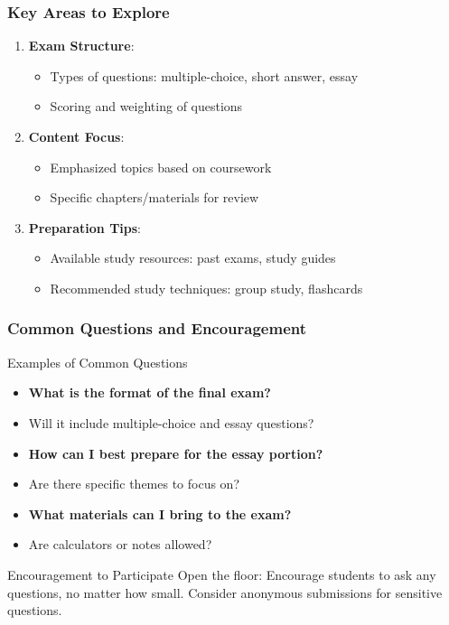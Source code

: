 \documentclass[aspectratio=169]{beamer}
\begin{document}
\begin{frame}[fragile]
    \frametitle{Key Areas to Explore}
    \begin{enumerate}
        \item \textbf{Exam Structure}:
            \begin{itemize}
                \item Types of questions: multiple-choice, short answer, essay
                \item Scoring and weighting of questions
            \end{itemize}
        
        \item \textbf{Content Focus}:
            \begin{itemize}
                \item Emphasized topics based on coursework
                \item Specific chapters/materials for review
            \end{itemize}
        
        \item \textbf{Preparation Tips}:
            \begin{itemize}
                \item Available study resources: past exams, study guides
                \item Recommended study techniques: group study, flashcards
            \end{itemize}
    \end{enumerate}
\end{frame}

\begin{frame}[fragile]
    \frametitle{Common Questions and Encouragement}
    \begin{block}{Examples of Common Questions}
        \begin{itemize}
            \item \textbf{What is the format of the final exam?}
                \item Will it include multiple-choice and essay questions?
            \item \textbf{How can I best prepare for the essay portion?}
                \item Are there specific themes to focus on?
            \item \textbf{What materials can I bring to the exam?}
                \item Are calculators or notes allowed?
        \end{itemize}
    \end{block}
    
    \begin{block}{Encouragement to Participate}
        Open the floor: Encourage students to ask any questions, no matter how small.
        Consider anonymous submissions for sensitive questions.
    \end{block}
\end{frame}
\end{document}
